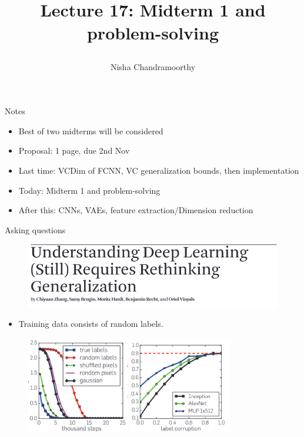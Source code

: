 \documentclass[final]{beamer}
\title{\begin{huge}{Lecture 17: Midterm 1 and problem-solving}\end{huge}} %
\author{Nisha Chandramoorthy} %
\begin{document}
\frame{\titlepage}

\begin{frame}{Notes}
\begin{itemize}
\item Best of two midterms will be considered
\pause
\item Proposal: 1 page, due 2nd Nov
\pause
\item Last time: VCDim of FCNN, VC generalization bounds, then implementation  
\pause
\item Today: Midterm 1 and problem-solving
\pause
\item After this: CNNs, VAEs, feature extraction/Dimension reduction
\end{itemize}
\end{frame}
\begin{frame}{Asking questions}
\begin{figure}
\includegraphics[width=\textwidth]{paperTitle.png}
\end{figure}
\begin{itemize}
\item Training data consists of random labels.
\end{itemize}
\pause
	\begin{figure}
	\includegraphics[width=0.4\textwidth]{trainingError.png}
	\includegraphics[width=0.4\textwidth]{testError.png}
	\end{figure}
\end{frame}
\end{document}
